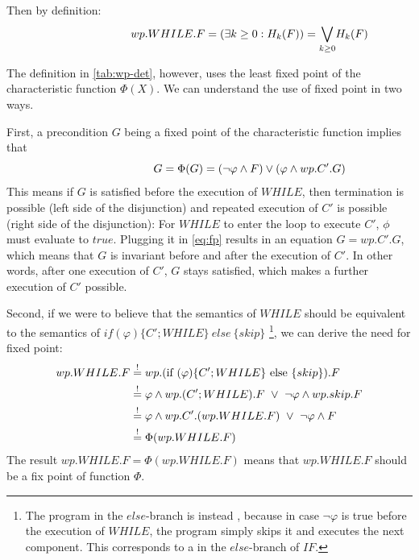 
Then by definition: 
\begin{equation}
  \hspace{2.5cm}
  wp.WHILE.F=(\exists k\geq 0: H_k(F)) = \underset{k\geq 0}{\bigvee} H_k(F) \label{eq:while}
\end{equation}

The definition in \autoref{tab:wp-det}, however, uses the least fixed point of the characteristic function $\Phi(X)$. 
We can understand the use of fixed point in two ways. 

First, a precondition $G$ being a fixed point of the characteristic function implies that 
\begin{equation}
  \hspace{2.5cm}
  G= \Phi(G)=(\neg\varphi\wedge F)\vee(\varphi\wedge wp.C'.G) \label{eq:fp}
\end{equation}
This means if $G$ is satisfied before the execution of $WHILE$, then termination is possible (left side of the disjunction) and repeated execution of $C'$ is possible (right side of the disjunction):
For $WHILE$ to enter the loop to execute $C'$, $\phi$ must evaluate to $true$.
Plugging it in \autoref{eq:fp} results in an equation $G=wp.C'.G$, which means that $G$ is invariant before and after the execution of $C'$. 
In other words, after one execution of $C'$, $G$ stays satisfied, which makes a further execution of $C'$ possible.

Second, if we were to believe that the semantics of $WHILE$ should be equivalent to the semantics of $if(\varphi)\{C';WHILE\}\ else\ \{skip\}$
\footnote{The program in the $else$-branch is  instead , because in case $\neg\varphi$ is true before the execution of $WHILE$, the program simply skips it and executes the next component. This corresponds to a  in the $else$-branch of $IF$. }, 
we can derive the need for fixed point: 
\begin{align*} 
  wp.WHILE.F    & \seq wp.(\text{if }(\varphi)\{C';WHILE\}\text{ else }\{skip\}).F \\
                & \seq \varphi\wedge wp.(C';WHILE).F \ \vee \ \neg\varphi\wedge wp.skip.F\\ 
                & \seq \varphi\wedge wp.C'.(wp.WHILE.F)\ \vee\ \neg\varphi\wedge F\\ 
                & \seq \Phi(wp.WHILE.F)\\ 
\end{align*}
The result $wp.WHILE.F = \Phi(wp.WHILE.F)$ means that $wp.WHILE.F$ should be a fix point of function $\Phi$.


